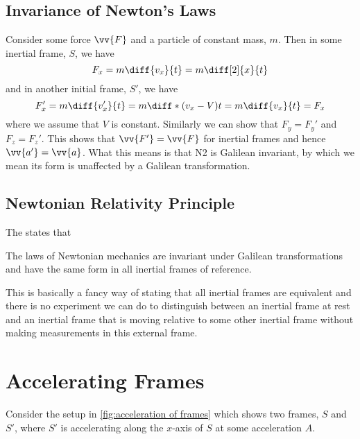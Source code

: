     \subsection{Invariance of Newton's Laws}
    Consider some force \(\vv{F}\) and a particle of constant mass, \(m\).
    Then in some inertial frame, \(S\), we have
    \begin{equation}
        F_x = m\diff{v_x}{t} = m\diff[2]{x}{t}
    \end{equation}
    and in another initial frame, \(S'\), we have
    \begin{equation}
        F_x' = m\diff{v_x'}{t} = m\diff*{(v_x - V)}{t} = m\diff{v_x}{t} = F_x
    \end{equation}
    where we assume that \(V\) is constant.
    Similarly we can show that \(F_y = F_y'\) and \(F_z = F_z'\).
    This shows that \(\vv{F'} = \vv{F}\) for inertial frames and hence \(\vv{a'} = \vv{a}\).
    What this means is that N2 is Galilean invariant, by which we mean its form is unaffected by a Galilean transformation.
    
    \subsection{Newtonian Relativity Principle}
    The  states that 
    \begin{displayquote}
        The laws of Newtonian mechanics are invariant under Galilean transformations and have the same form in all inertial frames of reference.
    \end{displayquote}
    This is basically a fancy way of stating that all inertial frames are equivalent and there is no experiment we can do to distinguish between an inertial frame at rest and an inertial frame that is moving relative to some other inertial frame without making measurements in this external frame.
    
    \section{Accelerating Frames}
    Consider the setup in \cref{fig:acceleration of frames} which shows two frames, \(S\) and \(S'\), where \(S'\) is accelerating along the \(x\)-axis of \(S\) at some acceleration \(A\).
    
